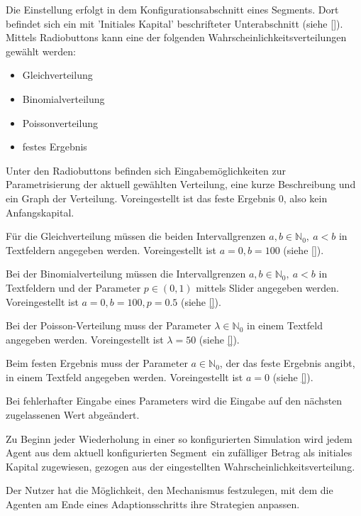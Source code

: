 \documentclass[parskip=full,11pt,twoside]{scrartcl}
\def\adapt{Adaptionsschritt}
\def\segment{Segment}
\begin{document}
Die Einstellung erfolgt in dem Konfigurationsabschnitt eines \segment s. Dort befindet sich ein mit 'Initiales Kapital' beschrifteter Unterabschnitt (siehe \cref{}). Mittels Radiobuttons kann eine der folgenden Wahrscheinlichkeitsverteilungen gewählt werden:
\begin{itemize}
\item Gleichverteilung
\item Binomialverteilung
\item Poissonverteilung
\item festes Ergebnis
\end{itemize}
Unter den Radiobuttons befinden sich Eingabemöglichkeiten zur Parametrisierung der aktuell gewählten Verteilung, eine kurze Beschreibung und ein Graph der Verteilung. Voreingestellt ist das feste Ergebnis \(0\), also kein Anfangskapital.

Für die Gleichverteilung müssen die beiden Intervallgrenzen \(a,b \in \mathbb{N}_0, \ a < b\) in Textfeldern angegeben werden. Voreingestellt ist \(a = 0, b = 100\) (siehe \cref{}).

Bei der Binomialverteilung müssen die Intervallgrenzen \(a,b \in \mathbb{N}_0, \ a < b\) in Textfeldern und der Parameter \(p \in (0,1)\) mittels Slider angegeben werden. Voreingestellt ist \(a = 0, b = 100, p = 0.5\) (siehe \cref{}).

Bei der Poisson-Verteilung muss der Parameter \(\lambda \in \mathbb{N}_0\) in einem Textfeld angegeben werden. Voreingestellt ist \(\lambda = 50\) (siehe \cref{}).

Beim festen Ergebnis muss der Parameter \(a \in \mathbb{N}_0\), der das feste Ergebnis angibt, in einem Textfeld angegeben werden. Voreingestellt ist \(a = 0\) (siehe \cref{}).

Bei fehlerhafter Eingabe eines Parameters wird die Eingabe auf den nächsten zugelassenen Wert abgeändert.

Zu Beginn jeder Wiederholung in einer so konfigurierten Simulation wird jedem Agent aus dem aktuell konfigurierten \segment\ ein zufälliger Betrag als initiales Kapital zugewiesen, gezogen aus der eingestellten Wahrscheinlichkeitsverteilung.



Der Nutzer hat die Möglichkeit, den Mechanismus festzulegen, mit dem die Agenten am Ende eines \adapt s ihre Strategien anpassen.
\end{document}
